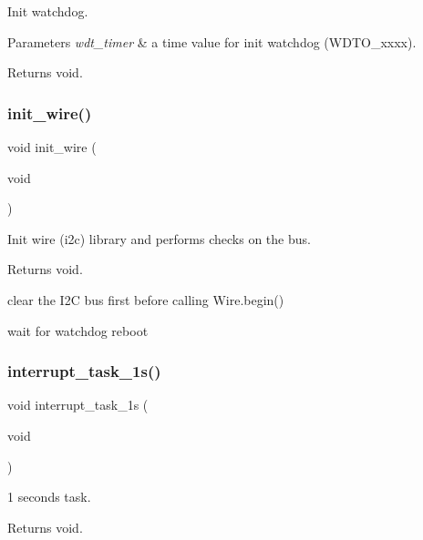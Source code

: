 Init watchdog. 


\begin{DoxyParams}{Parameters}
{\em wdt\+\_\+timer} & a time value for init watchdog (W\+D\+T\+O\+\_\+xxxx). \\
\hline
\end{DoxyParams}
\begin{DoxyReturn}{Returns}
void. 
\end{DoxyReturn}
\mbox{\label{rmap_8ino_a2441543100bf8421f56edd622a2c1d9a}} 
\subsubsection{\texorpdfstring{init\+\_\+wire()}{init\_wire()}}
{\footnotesize\ttfamily void init\+\_\+wire (\begin{DoxyParamCaption}\item[{void}]{ }\end{DoxyParamCaption})}



Init wire (i2c) library and performs checks on the bus. 

\begin{DoxyReturn}{Returns}
void. 
\end{DoxyReturn}
clear the I2C bus first before calling Wire.\+begin()

wait for watchdog reboot \mbox{\label{rmap_8ino_ab4f6973c82c5b3199823df3ae91abbda}} 
\subsubsection{\texorpdfstring{interrupt\+\_\+task\+\_\+1s()}{interrupt\_task\_1s()}}
{\footnotesize\ttfamily void interrupt\+\_\+task\+\_\+1s (\begin{DoxyParamCaption}\item[{void}]{ }\end{DoxyParamCaption})}



1 seconds task. 

\begin{DoxyReturn}{Returns}
void. 
\end{DoxyReturn}
\mbox{\label{rmap_8ino_a32a64a2800c724fb28e10636f2ec20b9}} 
